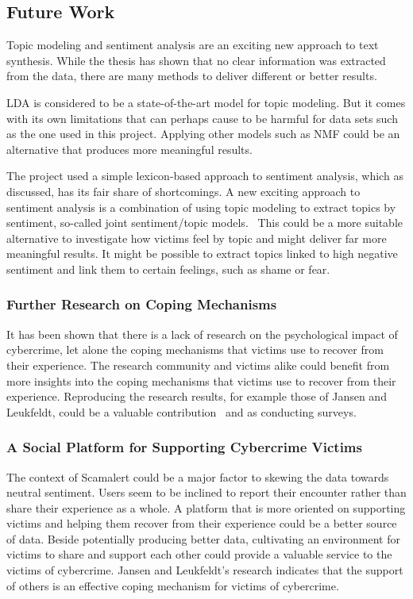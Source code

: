 \subsection{Future Work}

Topic modeling and sentiment analysis are an exciting new approach to text synthesis. While the thesis has shown that no clear information was extracted from the data, there are many methods to deliver different or better results.

LDA is considered to be a state-of-the-art model for topic modeling. But it comes with its own limitations that can perhaps cause to be harmful for data sets such as the one used in this project. Applying other models such as NMF could be an alternative that produces more meaningful results.

The project used a simple lexicon-based approach to sentiment analysis, which as discussed, has its fair share of shortcomings. A new exciting approach to sentiment analysis is a combination of using topic modeling to extract topics by sentiment, so-called joint sentiment/topic models.~\cite{lin2009joint} This could be a more suitable alternative to investigate how victims feel by topic and might deliver far more meaningful results. It might be possible to extract topics linked to high negative sentiment and link them to certain feelings, such as shame or fear.

\subsubsection*{Further Research on Coping Mechanisms}

It has been shown that there is a lack of research on the psychological impact of cybercrime, let alone the coping mechanisms that victims use to recover from their experience. The research community and victims alike could benefit from more insights into the coping mechanisms that victims use to recover from their experience. Reproducing the research results, for example those of Jansen and Leukfeldt, could be a valuable contribution~\cite{jansen2018coping} and as conducting surveys.

\subsubsection*{A Social Platform for Supporting Cybercrime Victims}

The context of Scamalert could be a major factor to skewing the data towards neutral sentiment. Users seem to be inclined to report their encounter rather than share their experience as a whole. A platform that is more oriented on supporting victims and helping them recover from their experience could be a better source of data. Beside potentially producing better data, cultivating an environment for victims to share and support each other could provide a valuable service to the victims of cybercrime. Jansen and Leukfeldt's research indicates that the support of others is an effective coping mechanism for victims of cybercrime.~\cite{jansen2018coping}